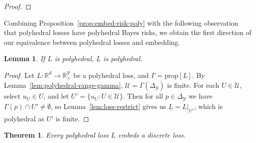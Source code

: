 \documentclass[12pt]{article}
\newcommand{\Comments}{1}
\newcommand{\mytodo}[2]{\ifnum\Comments=1%
  \todo[linecolor=#1!80!black,backgroundcolor=#1,bordercolor=#1!80!black]{#2}\fi}
\newcommand{\btw}[1]{}%
\newcommand{\reals}{\mathbb{R}}
\newcommand{\prop}[1]{\mathrm{prop}[#1]}
\newcommand{\simplex}{\Delta_\Y}
\newcommand{\U}{\mathcal{U}}
\newcommand{\Y}{\mathcal{Y}}
\newcommand{\risk}[1]{\underline{#1}}
\newcommand{\inter}[1]{\mathring{#1}}%
\DeclareMathOperator*{\argmin}{arg\,min}
\newtheorem{theorem}{Theorem}
\newtheorem{lemma}{Lemma}
\begin{document}
\begin{proof}
\end{proof}

Combining Proposition~\ref{prop:embed-risk-poly} with the following observation that polyhedral losses have polyhedral Bayes risks, we obtain the first direction of our equivalence between polyhedral losses and embedding.

\begin{lemma}
  \label{lem:poly-loss-poly-risk}
  If $L$ is polyhedral, $\risk{L}$ is polyhedral.
\end{lemma}
\begin{proof}
  Let $L:\reals^d\to\reals_+^\Y$ be a polyhedral loss, and $\Gamma = \prop{L}$.
  By Lemma~\ref{lem:polyhedral-range-gamma}, $\U = \Gamma(\simplex)$ is finite.
  For each $U\in \U$, select $u_U \in U$, and let $U' = \{u_U : U \in\U\}$.
  Then for all $p\in\simplex$ we have $\Gamma(p) \cap U' \neq \emptyset$, so Lemma~\ref{lem:loss-restrict} gives us $\risk{L} = \risk{L|_{U'}}$, which is polyhedral as $U'$ is finite.
  \btw{RF: interesting: we didn't need Proposition~\ref{prop:embed-risk-poly} after all.  This already gives the discrete loss $L$ embeds!}
\end{proof}

\begin{theorem}\label{thm:poly-embeds-discrete}
  Every polyhedral loss $L$ embeds a discrete loss.
\end{theorem}
\end{document}
